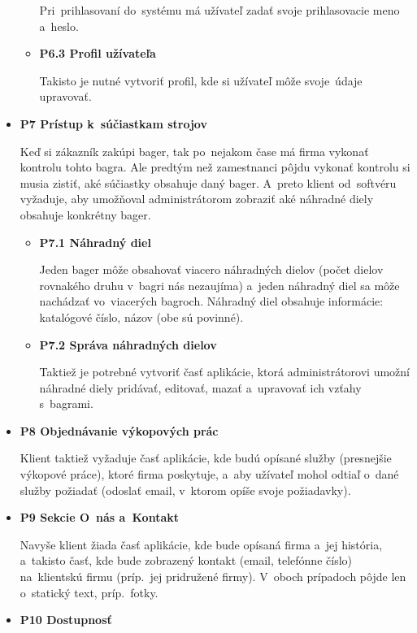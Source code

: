 \begin{itemize}
\begin{itemize}
Pri~prihlasovaní do~systému má užívateľ zadať svoje prihlasovacie meno a~heslo.

\item \textbf{P6.3 Profil užívateľa}

Takisto je nutné vytvoriť profil, kde si užívateľ môže svoje~údaje upravovať.
\end{itemize}

\item \textbf{P7 Prístup k~súčiastkam strojov}

Keď si zákazník zakúpi bager, tak po~nejakom čase má firma vykonať kontrolu tohto bagra. Ale predtým než zamestnanci pôjdu vykonať kontrolu si musia zistiť, aké súčiastky obsahuje daný bager. A~preto klient od~softvéru vyžaduje, aby umožňoval administrátorom zobraziť aké náhradné diely obsahuje konkrétny bager.

\begin{itemize}
\item \textbf{P7.1 Náhradný diel}

Jeden bager môže obsahovať viacero náhradných dielov (počet dielov rovnakého druhu v~bagri nás nezaujíma) a~jeden náhradný diel sa môže nachádzať vo~viacerých bagroch. Náhradný diel obsahuje informácie: katalógové číslo, názov (obe sú povinné).

\item \textbf{P7.2 Správa náhradných dielov}

Taktiež je potrebné vytvoriť časť aplikácie, ktorá administrátorovi umožní náhradné diely pridávať, editovať, mazať a~upravovať ich vzťa\-hy s~bagrami.
\end{itemize}

\item \textbf{P8 Objednávanie výkopových prác}

Klient taktiež vyžaduje časť aplikácie, kde budú opísané služby (presnejšie výkopové práce), ktoré firma poskytuje, a~aby užívateľ mohol odtiaľ o~dané služby požiadať (odoslať email, v~ktorom opíše svoje požiadavky).

\item \textbf{P9 Sekcie O~nás a~Kontakt}

Navyše klient žiada časť aplikácie, kde bude opísaná firma a~jej história, a~takisto časť, kde bude zobrazený kontakt (email, telefónne číslo) na~klientskú firmu (príp.~jej pridružené firmy). V~oboch prípadoch pôjde len o~statický text, príp.~fotky.

\item \textbf{P10 Dostupnosť}
\label{dostupnost}


\end{itemize}
